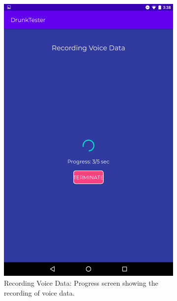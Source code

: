 \documentclass[12pt,a4paper]{article}
\begin{document}
\begin{figure}[htb!]
    \begin{subfigure}[b]{0.35\textwidth}
        \includegraphics[width=\textwidth]{materials/Recording_voice_data_2.png}
        \caption*{Recording Voice Data: Progress screen showing the recording of voice data.}
    \end{subfigure}
    \hfill
    \begin{subfigure}[b]{0.35\textwidth}

\end{subfigure}
\end{figure}
\end{document}
